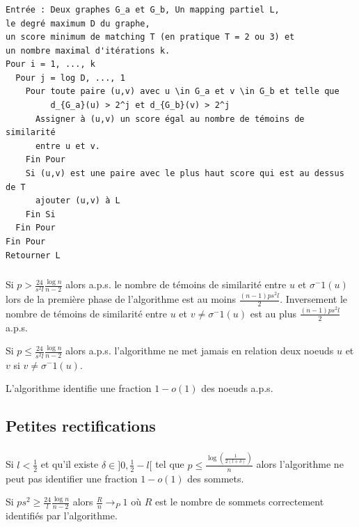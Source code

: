 \documentclass[11pt]{beamer}
\begin{document}
\begin{frame}[fragile]
\frametitle{\insertsubsection}

\begin{scriptsize}
\begin{verbatim}
Entrée : Deux graphes G_a et G_b, Un mapping partiel L, 
le degré maximum D du graphe, 
un score minimum de matching T (en pratique T = 2 ou 3) et 
un nombre maximal d'itérations k.
Pour i = 1, ..., k
  Pour j = log D, ..., 1
    Pour toute paire (u,v) avec u \in G_a et v \in G_b et telle que 
         d_{G_a}(u) > 2^j et d_{G_b}(v) > 2^j 
      Assigner à (u,v) un score égal au nombre de témoins de similarité 
      entre u et v.
    Fin Pour
    Si (u,v) est une paire avec le plus haut score qui est au dessus de T
      ajouter (u,v) à L
    Fin Si
  Fin Pour
Fin Pour
Retourner L
\end{verbatim}
\end{scriptsize}
\end{frame}

\begin{frame}
\frametitle{\insertsection}
\begin{lemme}
Si $p > \frac{24}{s^2 l} \frac{\log n}{n-2}$ alors a.p.s. le nombre de témoins de similarité entre $u$ et $\sigma^-1(u)$ lors de la première phase de l'algorithme  est au moins $\frac{(n-1)ps^2l}{2}$. Inversement le nombre de témoins de similarité entre $u$ et $v \neq \sigma^-1(u)$ est au plus  $\frac{(n-1)ps^2l}{2}$ a.p.s.
\end{lemme}

\begin{lemme}
Si $p \leq \frac{24}{s^2 l} \frac{\log n}{n-2}$ alors a.p.s. l'algorithme ne met jamais en relation deux noeuds $u$ et $v$ si  $v \neq \sigma^-1(u)$.
\end{lemme}

\begin{theoreme}
L'algorithme identifie une fraction $1 - o(1)$ des noeuds a.p.s.
\end{theoreme}
\end{frame}

\subsection{Petites rectifications}

\begin{frame}
\frametitle{\insertsubsection}
\begin{theoreme}
Si $l < \frac{1}{2}$ et qu'il existe $\delta \in ]0, \frac{1}{2} - l[$ tel que $p \leq \frac{\log(\frac{1}{2(l+\delta)})}{n}$ alors l'algorithme ne peut pas identifier une fraction $1-o(1)$ des sommets.
\end{theoreme}
\begin{theoreme}
Si $ps^2 \geq \frac{24}{l} \frac{\log n}{n-2}$ alors $\frac{R}{n} \rightarrow_{P} 1$ où $R$ est le nombre de sommets correctement identifiés par l'algorithme.
\end{theoreme}
\end{frame}
\end{document}
